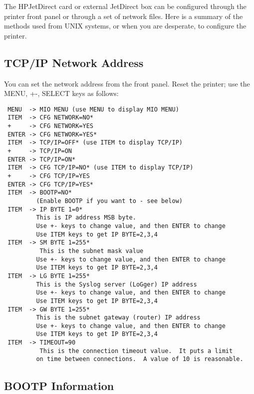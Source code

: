 \documentclass[a4paper]{article}
\begin{document}
The  HPJetDirect  card or external
JetDirect box can  be configured through the printer front
panel  or through a set of network files.  Here is a summary
of  the  methods  used  from  UNIX  systems, or when you are
desperate, to configure the printer.


\subsection{TCP/IP Network Address}

You can set the network address from the front panel.
Reset  the printer; use the MENU, +-, SELECT keys as follows:
\begin{tscreen}
\begin{verbatim}
 MENU  -> MIO MENU (use MENU to display MIO MENU)
 ITEM  -> CFG NETWORK=NO*
 +     -> CFG NETWORK=YES
 ENTER -> CFG NETWORK=YES*
 ITEM  -> TCP/IP=OFF* (use ITEM to display TCP/IP)
 +     -> TCP/IP=ON
 ENTER -> TCP/IP=ON*
 ITEM  -> CFG TCP/IP=NO* (use ITEM to display TCP/IP)
 +     -> CFG TCP/IP=YES
 ENTER -> CFG TCP/IP=YES*
 ITEM  -> BOOTP=NO*
         (Enable BOOTP if you want to - see below)
 ITEM  -> IP BYTE 1=0*
         This is IP address MSB byte.
         Use +- keys to change value, and then ENTER to change
         Use ITEM keys to get IP BYTE=2,3,4
 ITEM  -> SM BYTE 1=255*
          This is the subnet mask value
         Use +- keys to change value, and then ENTER to change
         Use ITEM keys to get IP BYTE=2,3,4
 ITEM  -> LG BYTE 1=255*
         This is the Syslog server (LoGger) IP address
         Use +- keys to change value, and then ENTER to change
         Use ITEM keys to get IP BYTE=2,3,4
 ITEM  -> GW BYTE 1=255*
         This is the subnet gateway (router) IP address
         Use +- keys to change value, and then ENTER to change
         Use ITEM keys to get IP BYTE=2,3,4
 ITEM  -> TIMEOUT=90
          This is the connection timeout value.  It puts a limit
         on time between connections.  A value of 10 is reasonable.
\end{verbatim}
\end{tscreen}



\subsection{BOOTP Information}
\end{document}
